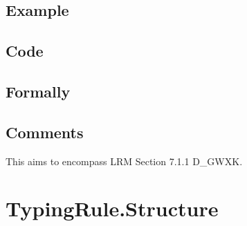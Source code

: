 \documentclass{book}
\begin{document}
    \subsection{Example}

    \subsection{Code}

\begin{formal}
  \subsection{Formally}

\end{formal}

    \subsection{Comments}
    This aims to encompass LRM Section 7.1.1 D\_GWXK.

\section{TypingRule.Structure}
\end{document}
